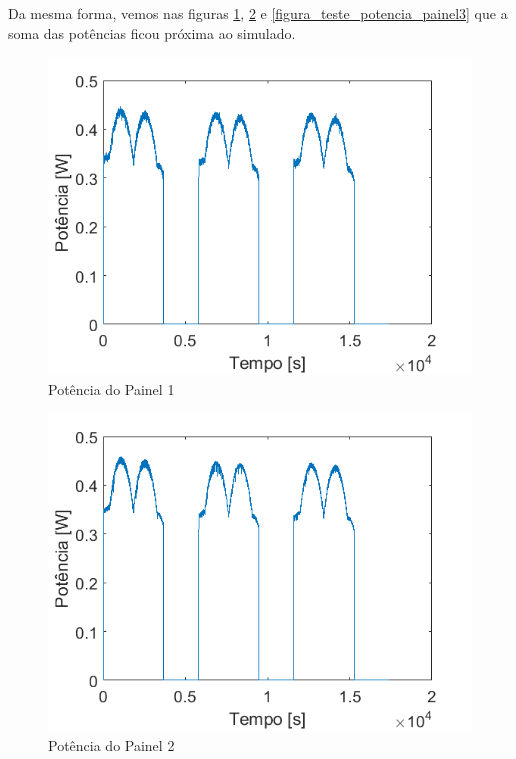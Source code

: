 Da mesma forma, vemos nas figuras \ref{figura_teste_potencia_painel1}, \ref{figura_teste_potencia_painel2} e \ref{figura_teste_potencia_painel3} que a soma das potências ficou próxima ao simulado.

\begin{figure}[!htpb]
\begin{center}
\includegraphics[scale=0.5]{figures/testPanel1Power.png}
\caption{Potência do Painel 1}
\label{figura_teste_potencia_painel1}
\end{center}
\end{figure}

\begin{figure}[!htpb]
\begin{center}
\includegraphics[scale=0.5]{figures/testPanel2Power.png}
\caption{Potência do Painel 2}
\label{figura_teste_potencia_painel2}
\end{center}
\end{figure}

